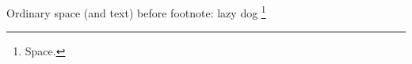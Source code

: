 \documentclass{article}
\begin{document}
%
Ordinary space (and text) before footnote: lazy dog \footnote{Space.}
\end{document}
